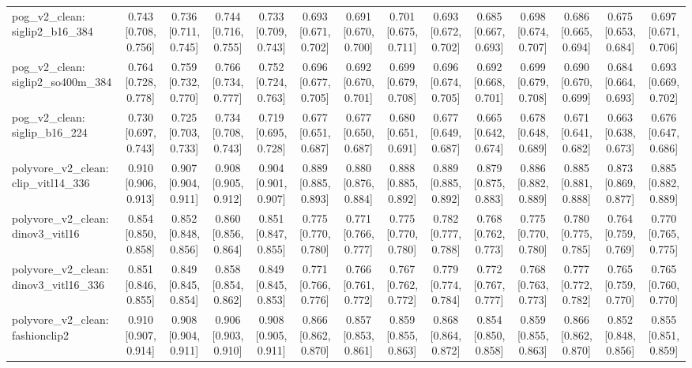\begin{table}[t]
\begin{tabular}{lccccccccccccc}
pog\_v2\_clean: siglip2\_b16\_384 & 0.743 [0.708, 0.756] & 0.736 [0.711, 0.745] & 0.744 [0.716, 0.755] & 0.733 [0.709, 0.743] & 0.693 [0.671, 0.702] & 0.691 [0.670, 0.700] & 0.701 [0.675, 0.711] & 0.693 [0.672, 0.702] & 0.685 [0.667, 0.693] & 0.698 [0.674, 0.707] & 0.686 [0.665, 0.694] & 0.675 [0.653, 0.684] & 0.697 [0.671, 0.706] \\
pog\_v2\_clean: siglip2\_so400m\_384 & 0.764 [0.728, 0.778] & 0.759 [0.732, 0.770] & 0.766 [0.734, 0.777] & 0.752 [0.724, 0.763] & 0.696 [0.677, 0.705] & 0.692 [0.670, 0.701] & 0.699 [0.679, 0.708] & 0.696 [0.674, 0.705] & 0.692 [0.668, 0.701] & 0.699 [0.679, 0.708] & 0.690 [0.670, 0.699] & 0.684 [0.664, 0.693] & 0.693 [0.669, 0.702] \\
pog\_v2\_clean: siglip\_b16\_224 & 0.730 [0.697, 0.743] & 0.725 [0.703, 0.733] & 0.734 [0.708, 0.743] & 0.719 [0.695, 0.728] & 0.677 [0.651, 0.687] & 0.677 [0.650, 0.687] & 0.680 [0.651, 0.691] & 0.677 [0.649, 0.687] & 0.665 [0.642, 0.674] & 0.678 [0.648, 0.689] & 0.671 [0.641, 0.682] & 0.663 [0.638, 0.673] & 0.676 [0.647, 0.686] \\
polyvore\_v2\_clean: clip\_vitl14\_336 & 0.910 [0.906, 0.913] & 0.907 [0.904, 0.911] & 0.908 [0.905, 0.912] & 0.904 [0.901, 0.907] & 0.889 [0.885, 0.893] & 0.880 [0.876, 0.884] & 0.888 [0.885, 0.892] & 0.889 [0.885, 0.892] & 0.879 [0.875, 0.883] & 0.886 [0.882, 0.889] & 0.885 [0.881, 0.888] & 0.873 [0.869, 0.877] & 0.885 [0.882, 0.889] \\
polyvore\_v2\_clean: dinov3\_vitl16 & 0.854 [0.850, 0.858] & 0.852 [0.848, 0.856] & 0.860 [0.856, 0.864] & 0.851 [0.847, 0.855] & 0.775 [0.770, 0.780] & 0.771 [0.766, 0.777] & 0.775 [0.770, 0.780] & 0.782 [0.777, 0.788] & 0.768 [0.762, 0.773] & 0.775 [0.770, 0.780] & 0.780 [0.775, 0.785] & 0.764 [0.759, 0.769] & 0.770 [0.765, 0.775] \\
polyvore\_v2\_clean: dinov3\_vitl16\_336 & 0.851 [0.846, 0.855] & 0.849 [0.845, 0.854] & 0.858 [0.854, 0.862] & 0.849 [0.845, 0.853] & 0.771 [0.766, 0.776] & 0.766 [0.761, 0.772] & 0.767 [0.762, 0.772] & 0.779 [0.774, 0.784] & 0.772 [0.767, 0.777] & 0.768 [0.763, 0.773] & 0.777 [0.772, 0.782] & 0.765 [0.759, 0.770] & 0.765 [0.760, 0.770] \\
polyvore\_v2\_clean: fashionclip2 & 0.910 [0.907, 0.914] & 0.908 [0.904, 0.911] & 0.906 [0.903, 0.910] & 0.908 [0.905, 0.911] & 0.866 [0.862, 0.870] & 0.857 [0.853, 0.861] & 0.859 [0.855, 0.863] & 0.868 [0.864, 0.872] & 0.854 [0.850, 0.858] & 0.859 [0.855, 0.863] & 0.866 [0.862, 0.870] & 0.852 [0.848, 0.856] & 0.855 [0.851, 0.859] \\

\end{tabular}
\end{table}
